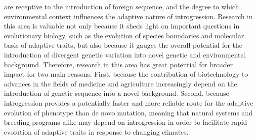 \documentclass[
]{agujournal2019}
\begin{document}
are receptive to the introduction of foreign sequence, and the degree to
which environmental context influences the adaptive nature of
introgression. Research in this area is valuable not only because it
sheds light on important questions in evolutionary biology, such as the
evolution of species boundaries and molecular basis of adaptive traits,
but also because it gauges the overall potential for the introduction of
divergent genetic variation into novel genetic and environmental
background. Therefore, research in this area has great potential for
broader impact for two main reasons. First, because the contribution of
biotechnology to advances in the fields of medicine and agriculture
increasingly depend on the introduction of genetic sequence into a novel
background. Second, because introgression provides a potentially faster
and more reliable route for the adaptive evolution of phenotype than de
novo mutation, meaning that natural systems and breeding programs alike
may depend on introgression in order to facilitate rapid evolution of
adaptive traits in response to changing climates.
\end{document}

